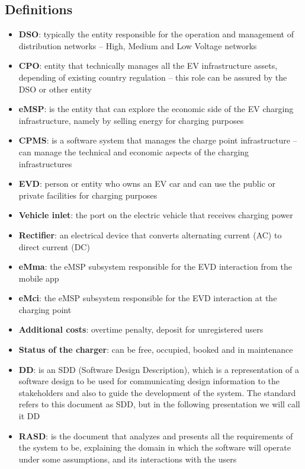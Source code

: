\subsection{Definitions}
\begin{itemize}
    \item \textbf{DSO}: typically the entity responsible for the operation and management of distribution networks – High, Medium and Low Voltage networks
    \item \textbf{CPO}: entity that technically manages all the EV infrastructure assets, depending of existing country regulation – this role can be assured by the DSO or other entity
    \item \textbf{eMSP}: is the entity that can explore the economic side of the EV charging infrastructure, namely by selling energy for charging purposes
    \item \textbf{CPMS}: is a software system that manages the charge point infrastructure – can manage the technical and economic aspects of the charging infrastructures
    \item  \textbf{EVD}: person or entity who owns an EV car and can use the public or private facilities for charging purposes
    \item \textbf{Vehicle inlet}: the port on the electric vehicle that receives charging power
    \item \textbf{Rectifier}: an electrical device that converts alternating current (AC) to direct current (DC)
    \item \textbf{eMma}: the eMSP subsystem responsible for the EVD interaction from the mobile app
    \item \textbf{eMci}: the eMSP subsystem responsible for the EVD interaction at the charging point
    \item \textbf{Additional costs}: overtime penalty, deposit for unregistered users
    \item \textbf{Status of the charger}: can be free, occupied, booked and in maintenance
    \item \textbf{DD}: is an SDD (Software Design Description), which is a representation of a software design to be used for communicating design information to the stakeholders and also to guide the development of the system. The standard refers to this document as SDD, but in the following presentation we will call it DD 
    \item \textbf{RASD}: is the document that analyzes and presents all the requirements of the system to be, explaining the domain in which the software will operate under some assumptions, and its interactions with the users 
\end{itemize}

